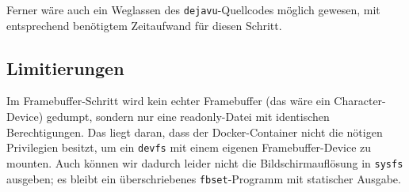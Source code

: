 \documentclass[parskip=half]{scrartcl}
\begin{document}
Ferner wäre auch ein Weglassen des \texttt{dejavu}-Quellcodes möglich gewesen, mit entsprechend benötigtem Zeitaufwand für diesen Schritt.

\subsection{Limitierungen}
Im Framebuffer-Schritt wird kein echter Framebuffer (das wäre ein Character-Device) gedumpt, sondern nur eine readonly-Datei mit identischen Berechtigungen. 
Das liegt daran, dass der Docker-Container nicht die nötigen Privilegien besitzt, um ein \texttt{devfs} mit einem eigenen Framebuffer-Device zu mounten.
Auch können wir dadurch leider nicht die Bildschirmauflösung in \texttt{sysfs} ausgeben; es bleibt ein überschriebenes \texttt{fbset}-Programm mit statischer Ausgabe.
\end{document}
